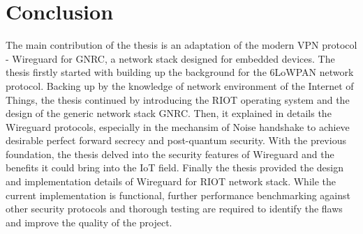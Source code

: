 \chapter{Conclusion}
  The main contribution of the thesis is an adaptation of the modern VPN protocol - Wireguard
  for GNRC, a network stack designed for embedded devices. The thesis firstly started
  with building up the background for the 6LoWPAN network protocol. Backing up by the
  knowledge of network environment of the Internet of Things, the thesis continued by introducing
  the RIOT operating system and the design of the generic network stack GNRC. Then, it explained
  in details the Wireguard protocols, especially in the mechansim of Noise handshake to 
  achieve desirable perfect forward secrecy and post-quantum security. With the previous foundation, 
  the thesis delved into the security features of Wireguard and the benefits it could bring into
  the IoT field. Finally the thesis provided the design and implementation details of
  Wireguard for RIOT network stack. While the current implementation is functional, further
  performance benchmarking against other security protocols and thorough testing are 
  required to identify the flaws and improve the quality of the project.